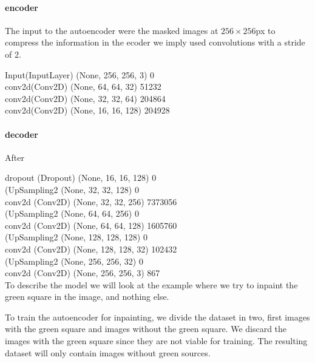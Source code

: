 \paragraph{encoder}
The input to the autoencoder were the masked images at $256 \times 256$px to compress the information in the ecoder we imply used convolutions with a stride of 2.

Input(InputLayer)         (None, 256, 256, 3)      0 \\
conv2d(Conv2D)            (None, 64, 64, 32)       51232    \\ 
conv2d(Conv2D)            (None, 32, 32, 64)       204864    \\
conv2d(Conv2D)            (None, 16, 16, 128)      204928\\  

\paragraph{decoder}
After 

dropout (Dropout)          (None, 16, 16, 128)       0         \\
(UpSampling2 (None, 32, 32, 128)       0         \\
conv2d (Conv2D)            (None, 32, 32, 256)       7373056   \\
(UpSampling2 (None, 64, 64, 256)       0    \\     
conv2d (Conv2D)            (None, 64, 64, 128)       1605760   \\
(UpSampling2 (None, 128, 128, 128)     0       \\ 
conv2d (Conv2D)            (None, 128, 128, 32)      102432    \\
(UpSampling2 (None, 256, 256, 32)      0       \\  
conv2d (Conv2D)            (None, 256, 256, 3)       867 \\


To describe the model we will look at the example where we try to inpaint the green square in the image, and nothing else.

To train the autoencoder for inpainting, we divide the dataset in two, first images with the green square and images without the green square. We discard the images with the green square since they are not viable for training. 
The resulting dataset will only contain images without green sources.

